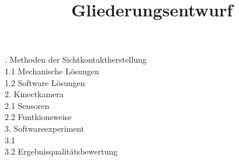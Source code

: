 \documentclass[11pt]{article}
\title{\textbf{Gliederungsentwurf}}
\date{} %
\begin{document}
. Methoden der Sichtkontaktherstellung\\
	1.1 Mechanische Lösungen\\
	1.2 Software Lösungen\\
2. Kinectkamera\\
	2.1 Sensoren\\
	2.2 Funtkionsweise\\
3. Softwareexperiment\\
	3.1 \\
	3.2 Ergebnisqualitätsbewertung\\
	
\end{document}
